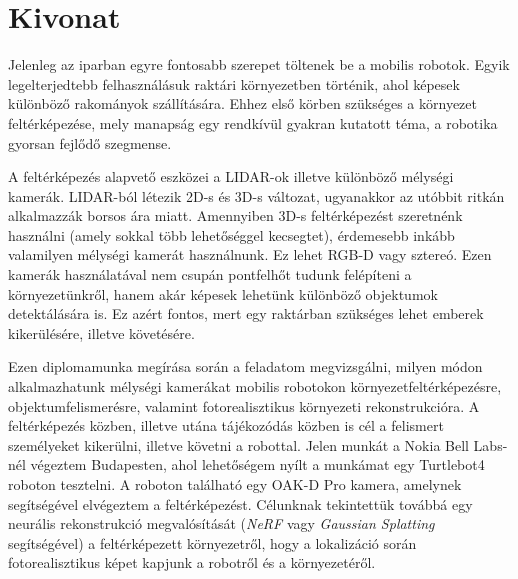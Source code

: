 \setcounter{page}{1}

\selecthungarian

\chapter*{Kivonat}

Jelenleg az iparban egyre fontosabb szerepet töltenek be a mobilis robotok. Egyik legelterjedtebb felhasználásuk raktári környezetben történik, ahol képesek különböző rakományok szállítására. Ehhez első körben szükséges a környezet feltérképezése, mely manapság egy rendkívül gyakran kutatott téma, a robotika gyorsan fejlődő szegmense.

A feltérképezés alapvető eszközei a LIDAR-ok illetve különböző mélységi kamerák. LIDAR-ból létezik 2D-s és 3D-s változat, ugyanakkor az utóbbit ritkán alkalmazzák borsos ára miatt. Amennyiben 3D-s feltérképezést szeretnénk használni (amely sokkal több lehetőséggel kecsegtet), érdemesebb inkább valamilyen mélységi kamerát használnunk. Ez lehet RGB-D vagy sztereó. Ezen kamerák használatával nem csupán pontfelhőt tudunk felépíteni a környezetünkről, hanem akár képesek lehetünk különböző objektumok detektálására is. Ez azért fontos, mert egy raktárban szükséges lehet emberek kikerülésére, illetve követésére.

Ezen diplomamunka megírása során a feladatom megvizsgálni, milyen módon alkalmazhatunk mélységi kamerákat mobilis robotokon környezetfeltérképezésre,  objektumfelismerésre, valamint fotorealisztikus környezeti rekonstrukcióra. A feltérképezés közben, illetve utána  tájékozódás közben is cél a felismert személyeket kikerülni, illetve követni a robottal. Jelen munkát a Nokia Bell Labs-nél végeztem Budapesten, ahol lehetőségem nyílt a munkámat egy Turtlebot4 roboton tesztelni. A roboton található egy OAK-D Pro kamera, amelynek segítségével elvégeztem a feltérképezést. Célunknak tekintettük továbbá egy neurális rekonstrukció megvalósítását (\textit{NeRF} vagy \textit{Gaussian Splatting} segítségével) a feltérképezett környezetről, hogy a lokalizáció során fotorealisztikus képet kapjunk a robotről és a környezetéről.


\vfill
\selectenglish


